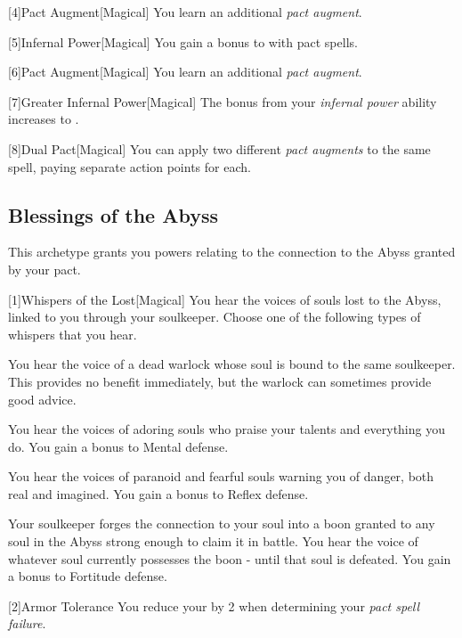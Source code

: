         [4]{Pact Augment}[Magical] You learn an additional \textit{pact augment}.

        [5]{Infernal Power}[Magical]
        You gain a  bonus to  with pact spells.

        [6]{Pact Augment}[Magical] You learn an additional \textit{pact augment}.

        [7]{Greater Infernal Power}[Magical]
        The bonus from your \textit{infernal power} ability increases to .

        [8]{Dual Pact}[Magical] You can apply two different \textit{pact augments} to the same spell, paying separate action points for each.

    \subsection{Blessings of the Abyss}
        This archetype grants you powers relating to the connection to the Abyss granted by your pact.

        [1]{Whispers of the Lost}[Magical] You hear the voices of souls lost to the Abyss, linked to you through your soulkeeper.
        Choose one of the following types of whispers that you hear.
        {
             You hear the voice of a dead warlock whose soul is bound to the same soulkeeper.
            This provides no benefit immediately, but the warlock can sometimes provide good advice.

             You hear the voices of adoring souls who praise your talents and everything you do.
            You gain a  bonus to Mental defense.

             You hear the voices of paranoid and fearful souls warning you of danger, both real and imagined.
            You gain a  bonus to Reflex defense.

             Your soulkeeper forges the connection to your soul into a boon granted to any soul in the Abyss strong enough to claim it in battle.
            You hear the voice of whatever soul currently possesses the boon - until that soul is defeated.
            You gain a  bonus to Fortitude defense.
        }

        [2]{Armor Tolerance} You reduce your  by 2 when determining your \textit{pact spell failure}.

